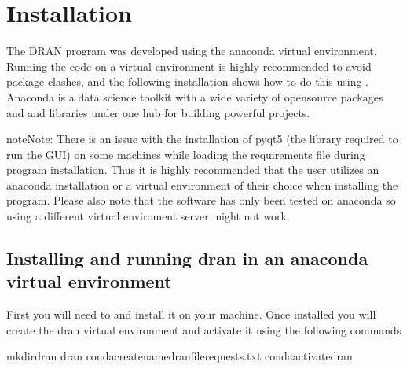 \documentclass[letterpaper,10pt,english]{sphinxmanual}
\begin{document}
\sphinxstepscope


\section{Installation}
\label{\detokenize{extras/installation:installation}}\label{\detokenize{extras/installation::doc}}
\sphinxAtStartPar
The DRAN program was developed using the anaconda virtual environment.
Running the code on a virtual environment is highly recommended to avoid
package clashes,
and the following installation shows how to do this using
.
Anaconda is a data science toolkit with a wide variety of open\sphinxhyphen{}source packages and
and libraries under one hub for building powerful projects.

\begin{sphinxadmonition}{note}{Note:}
\sphinxAtStartPar
There is an issue with the installation of pyqt5 (the library required to run the GUI) on some machines while
loading the requirements file during program installation. Thus it is highly
recommended that the user utilizes an anaconda installation or a virtual environment of their choice
when installing the program.
Please also note that the software has only been tested on anaconda so using a different virtual
enviroment server might not work.
\end{sphinxadmonition}


\subsection{Installing and running dran in an anaconda virtual environment}
\label{\detokenize{extras/installation:installing-and-running-dran-in-an-anaconda-virtual-environment}}
\sphinxAtStartPar
First you will need to  and install it on your machine.
Once installed you will create the dran virtual environment and activate it
using the following commands

\begin{sphinxVerbatim}[commandchars=\\\{\}]
\PYGZdl{}mkdirdran
\PYGZdl{}dran
\PYGZdl{}condacreate\PYGZhy{}\PYGZhy{}namedran\PYGZhy{}\PYGZhy{}filerequests.txt
\PYGZdl{}condaactivatedran
\end{sphinxVerbatim}
\end{document}
